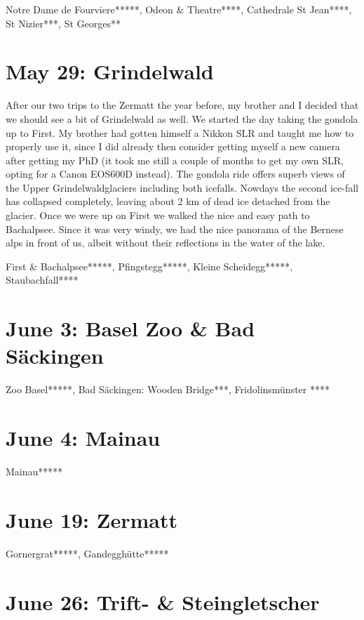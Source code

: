 Notre Dame de Fourviere*****, Odeon \& Theatre****, Cathedrale St Jean****, St Nizier***, St Georges**

\section{May 29: Grindelwald}
\label{Grindelwald2011}

After our two trips to the Zermatt the year before, my brother and I decided that we should see a bit of Grindelwald as well. We started the day taking the gondola up to First. My brother had gotten himself a Nikkon SLR and taught me how to properly use it, since I did already then consider getting myself a new camera after getting my PhD (it took me still a couple of months to get my own SLR, opting for a Canon EOS600D instead). The gondola ride offers superb views of the Upper Grindelwaldglaciers including both icefalls. Nowdays the second ice-fall has collapsed completely, leaving about 2 km of dead ice detached from the glacier. Once we were up on First we walked the nice and easy path to Bachalpsee. Since it was very windy, we had the nice panorama of the Bernese alps in front of us, albeit without their reflections in the water of the lake. 

First \& Bachalpsee*****, Pfingstegg*****, Kleine Scheidegg*****, Staubachfall****

\section{June 3: Basel Zoo \& Bad S\"ackingen}
\label{Basel2011}

Zoo Basel*****, Bad S\"ackingen: Wooden Bridge***, Fridolinsm\"unster ****

\section{June 4: Mainau}
\label{Mainau2011}

Mainau*****

\section{June 19: Zermatt}
\label{Zermatt2011}

Gornergrat*****, Gandeggh\"utte*****

\section{June 26: Trift- \& Steingletscher}
\label{Gadmen}

